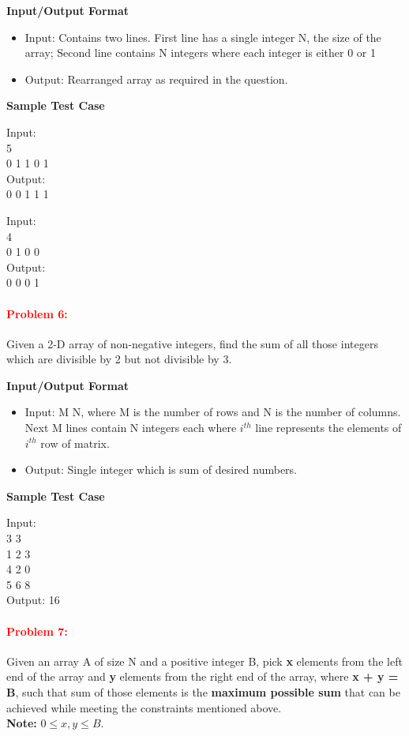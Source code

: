 \documentclass[a4paper,11pt]{article} %
\begin{document}
\textbf{Input/Output Format}
\begin{itemize}
    \item  Input: Contains two lines. First line has a single integer N, the size of the array; Second line contains N integers where each integer is either 0 or 1
    \item  Output: Rearranged array as required in the question.
\end{itemize}

\textbf{Sample Test Case}

Input:\\
5 \\
0 1 1 0 1  \\
Output:\\
0 0 1 1 1
\vspace*{0.5cm}

Input:\\
4\\
0 1 0 0 \\
Output:\\
0 0 0 1
\vspace*{0.5cm}
\paragraph{\textcolor{red}{Problem 6:}}
Given a 2-D array of non-negative integers, find the sum of all those integers which are divisible by 2 but not divisible by 3.

\textbf{Input/Output Format}
\begin{itemize}
    \item  Input: M N, where M is the number of rows and N is the number of columns. Next M lines contain N integers each where $i^{th}$ line represents the elements of  $i^{th}$ row of matrix.
    \item  Output: Single integer which is sum of desired numbers.
\end{itemize}

\textbf{Sample Test Case}

Input:\\
3 3\\
1 2 3\\
4 2 0\\
5 6 8\\
Output: 16
\vspace*{0.5cm}

\newpage
\paragraph{\textcolor{red}{Problem 7:}}
Given an array A of size N and a positive integer B, pick \textbf{x} elements from the left end of the array and \textbf{y} elements from the right end of the array, where \textbf{x + y = B}, such that sum of those elements is the \textbf{maximum possible sum} that can be achieved while meeting the constraints mentioned above.\\
\textbf{Note:} $0 \leq x,y \leq B$.
\end{document}
